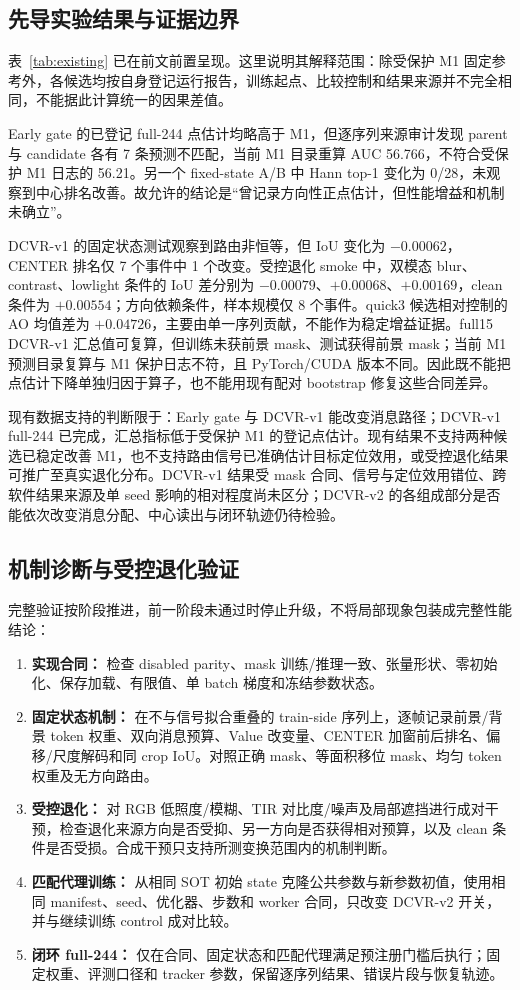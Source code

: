 \documentclass[journal]{IEEEtran}
\begin{document}
\subsection{先导实验结果与证据边界}
表~\ref{tab:existing} 已在前文前置呈现。这里说明其解释范围：除受保护 M1 固定参考外，各候选均按自身登记运行报告，训练起点、比较控制和结果来源并不完全相同，不能据此计算统一的因果差值。

Early gate 的已登记 full-244 点估计均略高于 M1，但逐序列来源审计发现 parent 与 candidate 各有 7 条预测不匹配，当前 M1 目录重算 AUC 56.766，不符合受保护 M1 日志的 56.21。另一个 fixed-state A/B 中 Hann top-1 变化为 0/28，未观察到中心排名改善。故允许的结论是“曾记录方向性正点估计，但性能增益和机制未确立”。

DCVR-v1 的固定状态测试观察到路由非恒等，但 IoU 变化为 $-0.00062$，CENTER 排名仅 7 个事件中 1 个改变。受控退化 smoke 中，双模态 blur、contrast、lowlight 条件的 IoU 差分别为 $-0.00079$、$+0.00068$、$+0.00169$，clean 条件为 $+0.00554$；方向依赖条件，样本规模仅 8 个事件。quick3 候选相对控制的 AO 均值差为 $+0.04726$，主要由单一序列贡献，不能作为稳定增益证据。full15 DCVR-v1 汇总值可复算，但训练未获前景 mask、测试获得前景 mask；当前 M1 预测目录复算与 M1 保护日志不符，且 PyTorch/CUDA 版本不同。因此既不能把点估计下降单独归因于算子，也不能用现有配对 bootstrap 修复这些合同差异。

现有数据支持的判断限于：Early gate 与 DCVR-v1 能改变消息路径；DCVR-v1 full-244 已完成，汇总指标低于受保护 M1 的登记点估计。现有结果不支持两种候选已稳定改善 M1，也不支持路由信号已准确估计目标定位效用，或受控退化结果可推广至真实退化分布。DCVR-v1 结果受 mask 合同、信号与定位效用错位、跨软件结果来源及单 seed 影响的相对程度尚未区分；DCVR-v2 的各组成部分是否能依次改变消息分配、中心读出与闭环轨迹仍待检验。

\subsection{机制诊断与受控退化验证}
完整验证按阶段推进，前一阶段未通过时停止升级，不将局部现象包装成完整性能结论：
\begin{enumerate}
  \item \textbf{实现合同：} 检查 disabled parity、mask 训练/推理一致、张量形状、零初始化、保存加载、有限值、单 batch 梯度和冻结参数状态。
  \item \textbf{固定状态机制：} 在不与信号拟合重叠的 train-side 序列上，逐帧记录前景/背景 token 权重、双向消息预算、Value 改变量、CENTER 加窗前后排名、偏移/尺度解码和同 crop IoU。对照正确 mask、等面积移位 mask、均匀 token 权重及无方向路由。
  \item \textbf{受控退化：} 对 RGB 低照度/模糊、TIR 对比度/噪声及局部遮挡进行成对干预，检查退化来源方向是否受抑、另一方向是否获得相对预算，以及 clean 条件是否受损。合成干预只支持所测变换范围内的机制判断。
  \item \textbf{匹配代理训练：} 从相同 SOT 初始 state 克隆公共参数与新参数初值，使用相同 manifest、seed、优化器、步数和 worker 合同，只改变 DCVR-v2 开关，并与继续训练 control 成对比较。
  \item \textbf{闭环 full-244：} 仅在合同、固定状态和匹配代理满足预注册门槛后执行；固定权重、评测口径和 tracker 参数，保留逐序列结果、错误片段与恢复轨迹。
\end{enumerate}
\end{document}
